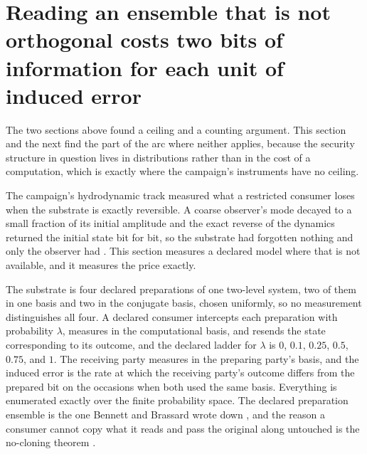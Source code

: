 \documentclass[aps,pre,reprint,nofootinbib]{revtex4-2}
\begin{document}
\section{Reading an ensemble that is not orthogonal costs two bits of
information for each unit of induced error}
\label{sec:cr6}

The two sections above found a ceiling and a counting argument.  This
section and the next find the part of the arc where neither applies,
because the security structure in question lives in distributions
rather than in the cost of a computation, which is exactly where the
campaign's instruments have no ceiling.

The campaign's hydrodynamic track measured what a restricted consumer
loses when the substrate is exactly reversible.  A coarse observer's
mode decayed to a small fraction of its initial amplitude and the
exact reverse of the dynamics returned the initial state bit for bit,
so the substrate had forgotten nothing and only the observer had
\cite{Gen2Paper}.  This section measures a
declared model where that is not available, and it measures the price
exactly.

The substrate is four declared preparations of one two-level system,
two of them in one basis and two in the conjugate basis, chosen
uniformly, so no measurement distinguishes all four.  A declared
consumer intercepts each preparation with probability $\lambda$,
measures in the computational basis, and resends the state
corresponding to its outcome, and the declared ladder for $\lambda$ is
$0$, $0.1$, $0.25$, $0.5$, $0.75$, and $1$.  The receiving party
measures in the preparing party's basis, and the induced error is the
rate at which the receiving party's outcome differs from the prepared
bit on the occasions when both used the same basis.  Everything is
enumerated exactly over the finite probability space.  The declared
preparation ensemble is the one Bennett and Brassard wrote down
\cite{BennettBrassard1984}, and the reason a consumer cannot copy what
it reads and pass the original along untouched is the no-cloning
theorem \cite{WoottersZurek1982}.
\end{document}
